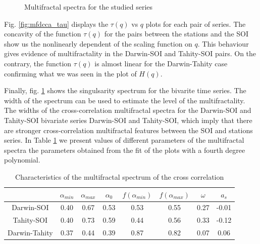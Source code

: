 \documentclass[onecolumn, preprint,aps,amsmath, amssymb, superscriptaddress]{revtex4}
\begin{document}
\begin{figure}
\caption{Multifractal spectra for the studied series}
\label{fig:mfdcca_spectrum}
\end{figure}

Fig. \ref{fig:mfdcca_tau} displays the $\tau(q)$ vs $q$ plots for each pair of series. The concavity of the function $\tau(q)$ for the pairs between the stations and the SOI show us the nonlinearly dependent of the scaling function on $q$. This behaviour gives evidence of multifractality in the Darwin-SOI and Tahity-SOI pairs. On the contrary, the function $\tau(q)$ is almost linear for the Darwin-Tahity case confirming what we was seen in the plot of $H(q)$.

Finally, fig. \ref{fig:mfdcca_spectrum} shows the singulsarity spectrum for the bivarite time series. The width of the spectrum can be used to estimate the level of the multifractality. The widths of the cross-correlation multifractal spectra for the Darwin-SOI and Tahity-SOI bivariate series Darwin-SOI and Tahity-SOI, which imply that there are stronger cross-correlation multifractal features between the SOI and stations series. In Table \ref{tab:mfdcca} we present values of different parameters of the multifractal spectra the parameters obtained from the fit of the plots with a fourth degree polynomial.

\begin{table}[t]
\begin{center}
\begin{tabular}{ c  c  c  c  c  c  c  c }
\hline

   & $\alpha_{min}$  & $\alpha_{max}$ & $\alpha_0$ & $f(\alpha_{min})$ & $f(\alpha_{max})$ & $\omega$& $a_s$ \\ \hline
Darwin-SOI   & 0.40  & 0.67  & 0.53  & 0.53 &  0.55 &  0.27 &  -0.01 \\
Tahity-SOI     & 0.40  & 0.73  & 0.59  & 0.44 &  0.56 &  0.33 &  -0.12 \\
Darwin-Tahity     & 0.37  & 0.44  & 0.39  & 0.87 &  0.82 &  0.07 &  0.06 \\
\hline
\end{tabular}
\caption{Characteristics of the multifractal spectrum of the cross correlation}
\label{tab:mfdcca}
\end{center}
\end{table}
\end{document}
